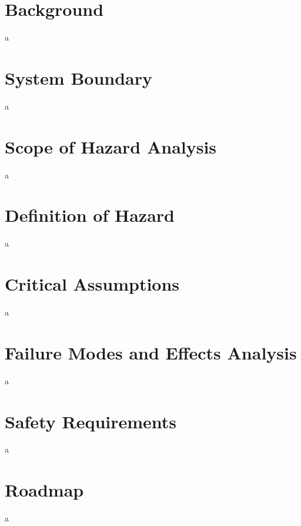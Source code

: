\documentclass[12pt]{article}
\begin{document}
\section{Background}
a

\section{System Boundary}
a

\section{Scope of Hazard Analysis}
a

\section{Definition of Hazard}
a

\section{Critical Assumptions}
a

\section{Failure Modes and Effects Analysis}
a

\section{Safety Requirements}
a

\section{Roadmap}
a
\end{document}
